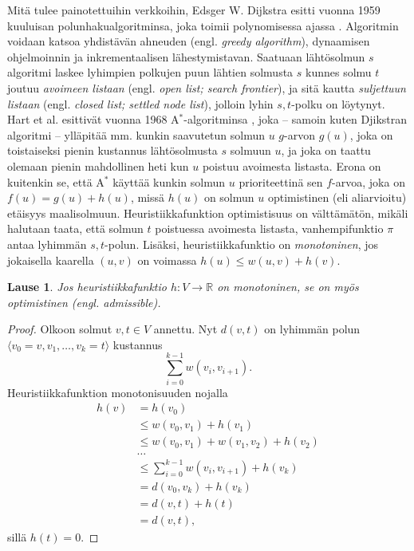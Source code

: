 \documentclass[finnish]{tktltiki2}
\newtheorem{lau}{Lause}
\theoremstyle{definition}
\theoremstyle{remark}
\begin{document}
Mitä tulee painotettuihin verkkoihin, Edsger W. Dijkstra esitti vuonna 1959 kuuluisan polunhakualgoritminsa, joka toimii polynomisessa ajassa \cite{Dijkstra59}. Algoritmin voidaan katsoa yhdistävän ahneuden (engl. \textit{greedy algorithm}), dynaamisen ohjelmoinnin ja inkrementaalisen lähestymistavan. Saatuaan lähtösolmun $s$ algoritmi laskee lyhimpien polkujen puun lähtien solmusta $s$ kunnes solmu $t$ joutuu \textit{avoimeen listaan} (engl. \textit{open list; search frontier}), ja sitä kautta \textit{suljettuun listaan} (engl. \textit{closed list; settled node list}), jolloin lyhin $s, t$-polku on löytynyt. Hart et al. esittivät vuonna 1968 A$^{\ast}$-algoritminsa \cite{Hart68},  joka -- samoin kuten Djikstran algoritmi -- ylläpitää mm. kunkin saavutetun solmun $u$ $g$-arvon $g(u)$, joka on toistaiseksi pienin kustannus lähtösolmusta $s$ solmuun $u$, ja joka on taattu olemaan pienin mahdollinen heti kun $u$ poistuu avoimesta listasta. Erona on kuitenkin se, että A$^{\ast}$ käyttää kunkin solmun $u$ prioriteettinä sen $f$-arvoa, joka on $f(u) = g(u) + h(u)$, missä $h(u)$ on solmun $u$ optimistinen (eli aliarvioitu) etäisyys maalisolmuun. Heuristiikkafunktion optimistisuus on välttämätön, mikäli halutaan taata, että solmun $t$ poistuessa avoimesta listasta, vanhempifunktio $\pi$ antaa lyhimmän $s,t$-polun. Lisäksi, heuristiikkafunktio on \textit{monotoninen}, jos jokaisella kaarella $(u, v)$ on voimassa $h(u) \leq w(u, v) + h(v)$.
\begin{lau}
Jos heuristiikkafunktio $h \colon V \to \mathbb{R}$ on monotoninen, se on myös optimistinen (engl. \textit{admissible}).
\end{lau}
\begin{proof}
Olkoon solmut $v, t \in V$ annettu. Nyt $d(v, t)$ on lyhimmän polun $\langle v_0 = v, v_1, \dots, v_k = t \rangle$ kustannus 
\[
\sum_{i = 0}^{k - 1} w(v_i, v_{i + 1}).
\]
Heuristiikkafunktion monotonisuuden nojalla
\begin{align*}
h(v) &= h(v_0) \\
          &\leq w(v_0, v_1) + h(v_1) \\
          &\leq w(v_0, v_1) + w(v_1, v_2) + h(v_2) \\
          &\dots \\
          &\leq \sum_{i = 0}^{k - 1} w(v_i, v_{i + 1}) + h(v_k) \\
          &= d(v_0, v_k) + h(v_k) \\
          &= d(v, t) + h(t) \\
          &= d(v, t),
\end{align*}
sillä $h(t) = 0$.
\end{proof}
\end{document}
